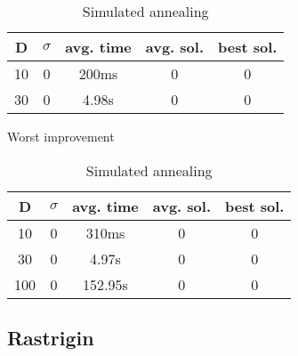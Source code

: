 \documentclass{article}
\begin{document}
\begin{table}[!htbp]
\begin{minipage}{.4\linewidth}
    \centering

    \begin{tabular}{|c|c|c|c|c|}
    \hline
    D   & $\sigma$  & avg. time     & avg. sol.     & best sol. \\
    \hline
    10  & 0         & 200ms         & 0             & 0 \\
    \hline
    30  & 0         & 4.98s         & 0             & 0 \\
    \hline
    \end{tabular}
    \caption{Worst improvement}
  \end{minipage}%
  \quad %
  \begin{minipage}{.75\linewidth}
    \centering

    \begin{tabular}{|c|c|c|c|c|}
    \hline
    D   & $\sigma$  & avg. time     & avg. sol.     & best sol. \\
    \hline
    10  & 0         & 310ms         & 0             & 0 \\
    \hline
    30  & 0         & 4.97s         & 0             & 0 \\
    \hline
    100 & 0         & 152.95s       & 0             & 0 \\
    \hline
    \end{tabular}
    \caption{Simulated annealing}
  \end{minipage}
\end{table}

\newpage
\setcounter{table}{0}

\subsection{Rastrigin}
    
\end{document}
